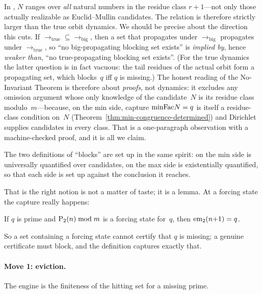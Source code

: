 \begin{remark}
\label{rem:over-approximation}
In , $N$ ranges over \emph{all} natural numbers in the
residue class $r+1$---not only those actually realizable as
Euclid--Mullin candidates.  The relation is therefore strictly larger
than the true orbit dynamics.  We should be precise about the direction
this cuts.  If $\to_{\mathrm{true}} \subseteq \to_{\mathrm{big}}$, then a set that
propagates under $\to_{\mathrm{big}}$ propagates under
$\to_{\mathrm{true}}$, so ``no big-propagating blocking set exists'' is
\emph{implied by}, hence \emph{weaker than}, ``no true-propagating
blocking set exists''.  (For the true dynamics the latter question is in
fact vacuous: the tail residues of the actual orbit form a propagating
set, which blocks~$q$ iff $q$ is missing.)  The honest reading of the
No-Invariant Theorem is therefore about \emph{proofs}, not dynamics: it
excludes any omission argument whose only knowledge of the candidate~$N$
is its residue class modulo~$m$---because, on the min side, capture
$\mathrm{minFac} N = q$ is itself a residue-class condition on~$N$
(Theorem~\ref{thm:min-congruence-determined}) and Dirichlet supplies
candidates in every class.  That is a one-paragraph observation with a
machine-checked proof, and it is all we claim.

The two definitions of ``blocks'' are set up in the same spirit: on the
min side  is universally quantified over candidates,
on the max side  is existentially quantified, so
that each side is set up against the conclusion it reaches.
\end{remark}

\noindent
That  is the right notion is not a matter of taste; it is a
lemma.  At a forcing state the capture really happens:

\begin{lemma}
\label{lem:forcing-captures}
If $q$ is prime and $\mathrm{P}_{2}(n) \bmod m$ is a forcing state for~$q$,
then $\mathrm{em}_{2}(n{+}1) = q$.
\end{lemma}

\noindent
So a set containing a forcing state cannot certify that $q$ is missing;
a genuine certificate must block, and the definition captures exactly
that.

\paragraph{Move 1: eviction.}
The engine is the finiteness of the hitting set for a missing prime.

